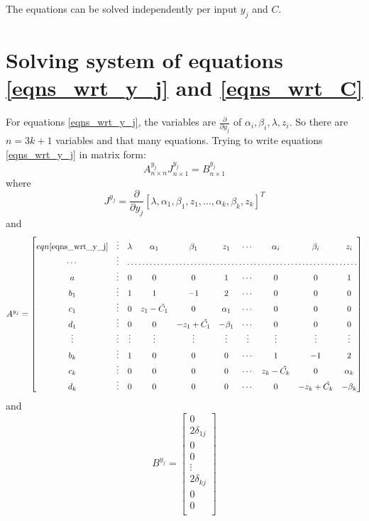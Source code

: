 \documentclass[11 pt]{article}
\begin{document}
The equations can be solved independently per input $y_j$ and $C$.


\section{Solving system of equations \ref{eqns_wrt_y_j} and \ref{eqns_wrt_C}}

For equations \ref{eqns_wrt_y_j}, the variables are $\frac{\partial}{\partial y_j}$ of $\alpha_i,\beta_i,\lambda,z_i$. So there are $n=3k + 1$ variables and that many equations.
Trying to write equations \ref{eqns_wrt_y_j} in matrix form:
\[A_{n \times n}^{y_j}J_{n \times 1}^{y_j} = B_{n \times 1}^{y_j}\]
where
\[J^{y_j} = \frac{\partial}{\partial y_j}[\lambda,\alpha_1,\beta_1,z_1,...,\alpha_k,\beta_k,z_k]^T\]
and
\[
A^{y_j} = \begin{bmatrix}
    eqn \ref{eqns_wrt_y_j} & \vdots & \lambda & \alpha_1 & \beta_1 & z_1 & \cdots & \alpha_i & \beta_i & z_i \\
    \cdots & \vdots & \hdotsfor{8} \\
    a & \vdots & 0 & 0 & 0 & 1 & \cdots & 0 & 0 & 1 \\
    b_1 & \vdots & 1 & 1 & -1 & 2 & \cdots & 0 & 0 & 0 \\
    c_1 & \vdots & 0 & z_1-\hat{C_1} & 0 & \alpha_1 & \cdots & 0 & 0 & 0 \\
    d_1 & \vdots & 0 & 0 & -z_1+\check{C_1} & -\beta_1 & \cdots & 0 & 0 & 0 \\
    \vdots & \vdots & \vdots & \vdots & \vdots & \vdots & \vdots & \vdots & \vdots & \vdots \\
    b_k & \vdots & 1 & 0 & 0 & 0 & \cdots & 1 & -1 & 2 \\
    c_k & \vdots & 0 & 0 & 0 & 0 & \cdots & z_k-\hat{C_k} & 0 & \alpha_k \\
    d_k & \vdots & 0 & 0 & 0 & 0 & \cdots & 0 & -z_k+\check{C_k} & -\beta_k \\
\end{bmatrix}
\]
and
\[
B^{y_j} = \begin{bmatrix}
    0 \\
    2\delta_{1j} \\
    0 \\
    0 \\
    \vdots \\
    2\delta_{kj} \\
    0 \\
    0 \\
\end{bmatrix}
\]
\end{document}
